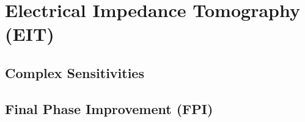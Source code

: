 \section{Electrical Impedance Tomography (EIT)}\label{sect:crtomo_eit}
\subsection{Complex Sensitivities}\label{sub:crtomo_eit_adj}
\subsection{Final Phase Improvement (FPI)}\label{sub:crtomo_eit_fpi}
